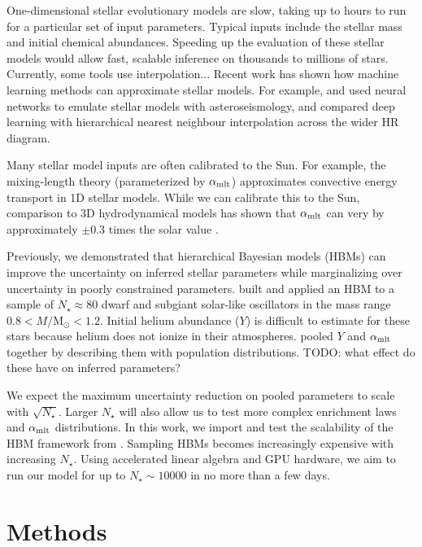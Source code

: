 \documentclass[fleqn,usenatbib]{mnras}
\newcommand{\mlt}[1][]{{\ensuremath{\alpha_{\mathrm{mlt} \ifx#1\empty \else , #1 \fi}}}}
\newcommand{\solarmass}{\ensuremath{\mathrm{M}_\odot}}
\begin{document}
One-dimensional stellar evolutionary models are slow, taking up to hours to run for a particular set of input parameters. Typical inputs include the stellar mass and initial chemical abundances. Speeding up the evaluation of these stellar models would allow fast, scalable inference on thousands to millions of stars. Currently, some tools use interpolation... Recent work has shown how machine learning methods can approximate stellar models. For example, \citet{Lyttle.Davies.ea2021} and \citet{Scutt.Murphy.ea2023} used neural networks to emulate stellar models with asteroseismology, and \citet{Maltsev.Schneider.ea2023} compared deep learning with hierarchical nearest neighbour interpolation across the wider HR diagram.

Many stellar model inputs are often calibrated to the Sun. For example, the mixing-length theory (parameterized by \(\mlt\)) approximates convective energy transport in 1D stellar models. While we can calibrate this to the Sun, comparison to 3D hydrodynamical models has shown that \(\mlt\) can very by approximately \(\pm 0.3\) times the solar value \citep[e.g.][]{Magic.Weiss.ea2015}. 

Previously, we demonstrated that hierarchical Bayesian models (HBMs) can improve the uncertainty on inferred stellar parameters while marginalizing over uncertainty in poorly constrained parameters. \citet{Lyttle.Davies.ea2021} built and applied an HBM to a sample of \(N_\star \approx 80\) dwarf and subgiant solar-like oscillators in the mass range \(0.8 < M/\solarmass < 1.2\). Initial helium abundance (\(Y\)) is difficult to estimate for these stars because helium does not ionize in their atmospheres. \citet{Lyttle.Davies.ea2021} pooled \(Y\) and \(\mlt\) together by describing them with population distributions. TODO: what effect do these have on inferred parameters?

We expect the maximum uncertainty reduction on pooled parameters to scale with \(\sqrt{N_\star}\). Larger \(N_\star\) will also allow us to test more complex enrichment laws and \(\mlt\) distributions. In this work, we import and test the scalability of the HBM framework from \citet{Lyttle.Davies.ea2021}. Sampling HBMs becomes increasingly expensive with increasing \(N_\star\). Using accelerated linear algebra and GPU hardware, we aim to run our model for up to \(N_\star \sim 10000\) in no more than a few days.

\section{Methods}
\label{sec:methods}
\end{document}
